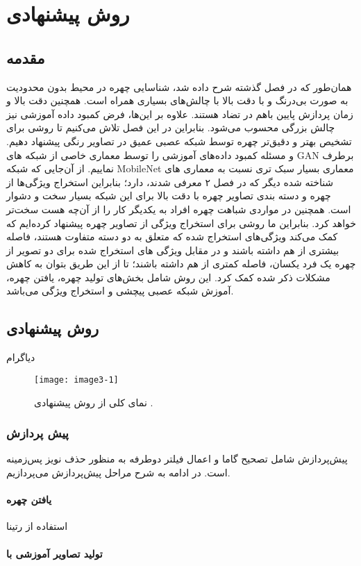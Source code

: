 \chapter{ روش پیشنهادی }
\section{مقدمه}

همان‌طور که در فصل‌ گذشته شرح داده شد، شناسایی چهره در محیط بدون محدودیت به صورت بی‌درنگ و با دقت بالا با چالش‌های بسیاری همراه است. همچنین دقت بالا و زمان پردازش پایین باهم در تضاد هستند. علاوه بر این‌ها، فرض ‌کمبود داده آموزشی نیز چالش بزرگی محسوب می‌شود. بنابراین در این فصل تلاش می‌کنیم تا روشی برای تشخیص بهتر و دقیق‌تر چهره توسط شبکه عصبی عمیق در تصاویر رنگی پیشنهاد دهیم. و مسئله کمبود داده‌های آموزشی را توسط معماری خاصی از شبکه های GAN برطرف نماییم.
\noindent
از آن‌جایی که ‌شبکه MobileNet معماری بسیار سبک تری نسبت به معماری های شناخته شده دیگر که در فصل ۲ معرفی شدند، دارد؛ بنابراین استخراج ویژگی‌ها از چهره و دسته بندی تصاویر چهره با دقت بالا برای این شبکه بسیار سخت و دشوار است. همچنین در مواردی شباهت چهره افراد به یکدیگر ‌کار را از آن‌چه هست سخت‌تر خواهد کرد. بنابراین ما روشی برای استخراج ویژگی از تصاویر چهره پیشنهاد کرده‌ایم که کمک می‌کند ویژگی‌های استخراج شده که متعلق به دو دسته متفاوت هستند، فاصله بیشتری از هم داشته باشند و در مقابل ویژگی های استخراج شده برای دو تصویر از چهره یک فرد یکسان، فاصله کمتری از هم داشته باشند؛ تا از این طریق بتوان به کاهش مشکلات ذکر شده کمک کرد. این روش شامل بخش‌های تولید چهره، یافتن چهره، آموزش شبکه عصبی پیچشی و ‌استخراج ویژگی می‌باشد.
\section{روش پیشنهادی}
دیاگرام
\begin{figure}[h]
\centering
  \texttt{[image: image3-1]}
  \caption{نمای کلی از روش پیشنهادی \cite{ref1}.}
  \label{image2-1}
\end{figure}

\subsection{پیش پردازش}
پیش‌پردازش شامل تصحیح گاما و اعمال فیلتر دوطرفه به منظور حذف نویز پس‌زمینه است. در ادامه به شرح مراحل پیش‌پردازش می‌پردازیم.
\subsubsection{یافتن چهره}
استفاده از رتینا
\subsubsection{تولید تصاویر آموزشی با }

